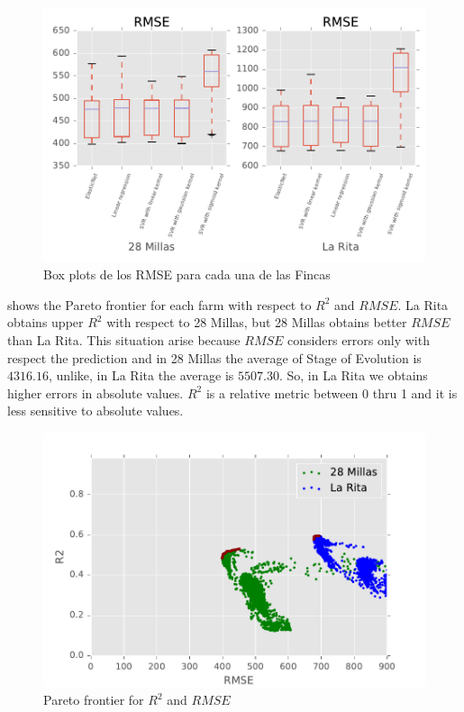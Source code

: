 %
\begin{figure}[H] 
 \centering
 \includegraphics[scale=.8]{Usado_2017-04-30_Sigatoka_RMSE_Boxplot_4}
 \caption{Box plots de los RMSE para cada una de las Fincas} 
 \label{figura4} 
\end{figure}
%
 shows the Pareto frontier for each farm with respect to $R^2$ and $RMSE$. La Rita obtains upper $R^2$ with respect to 28 Millas, but 28 Millas obtains better $RMSE$ than La Rita. This situation arise because $RMSE$ considers errors only with respect the prediction and in 28 Millas the average of Stage of Evolution is $4316.16$, unlike, in La Rita the average is $5507.30$. So, in La Rita we obtains higher errors in absolute values. $R^2$  is a relative metric between 0 thru 1 and it is less sensitive to absolute values.
%
\begin{figure}[H] 
 \centering
 \includegraphics[scale=.8]{Usado_2017-04-30_Sigatoka_R2_RMSE}
 \caption{Pareto frontier for $R^2$ and $RMSE$} 
 \label{figura5} 
\end{figure}

